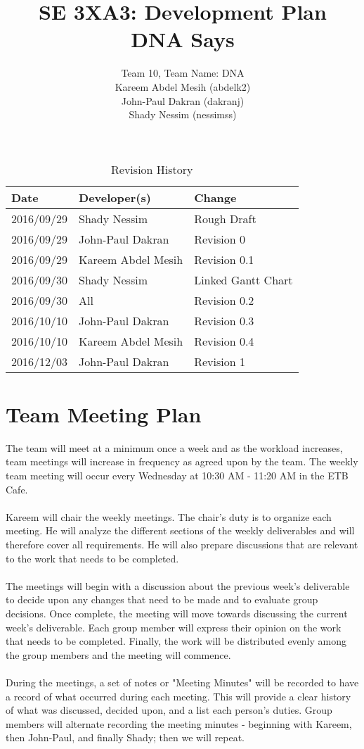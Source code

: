 \documentclass{article}
\title{SE 3XA3: Development Plan\\DNA Says}
\author{Team 10, Team Name: DNA
		\\ Kareem Abdel Mesih (abdelk2)
		\\ John-Paul Dakran (dakranj)
		\\ Shady Nessim (nessimss)
}
\date{}
\begin{document}
\maketitle
\newpage
\tableofcontents

\begin{table}[hp]
\caption{Revision History} \label{TblRevisionHistory}
\begin{tabularx}{\textwidth}{llX}
\toprule
\textbf{Date} & \textbf{Developer(s)} & \textbf{Change}\\
\midrule
2016/09/29 & Shady Nessim & Rough Draft\\
2016/09/29 & John-Paul Dakran &  Revision 0\\
2016/09/29 & Kareem Abdel Mesih &  Revision 0.1\\
2016/09/30 & Shady Nessim & Linked Gantt Chart\\
2016/09/30 & All & Revision 0.2\\
2016/10/10 & John-Paul Dakran & Revision 0.3\\
2016/10/10 & Kareem Abdel Mesih & Revision 0.4\\
2016/12/03 & John-Paul Dakran & Revision 1\\
\bottomrule
\end{tabularx}
\end{table}
\newpage
\newpage


\section{Team Meeting Plan} 
The team will meet at a minimum once a week and as the workload increases, team meetings will increase in frequency as agreed upon by the team. The weekly team meeting will occur every Wednesday at 10:30 AM - 11:20 AM in the ETB Cafe.\\
\\
\indent Kareem will chair the weekly meetings. The chair's duty is to organize each meeting. He will analyze the different sections of the weekly deliverables and will therefore cover all requirements. He will also prepare discussions that are relevant to the work that needs to be completed.\\
\\
\indent The meetings will begin with a discussion about the previous week's deliverable to decide upon any changes that need to be made and to evaluate group decisions. Once complete, the meeting will move towards discussing the current week's deliverable. Each group member will express their opinion on the work that needs to be completed. Finally, the work will be distributed evenly among the group members and the meeting will commence.\\
\\
\indent During the  meetings, a set of notes or "Meeting Minutes" will be recorded to have a record of what occurred during each meeting. This will provide a clear history of what was discussed, decided upon, and a list each person's duties. Group members will alternate recording the meeting minutes - beginning with Kareem, then John-Paul, and finally Shady; then we will repeat.
\end{document}
